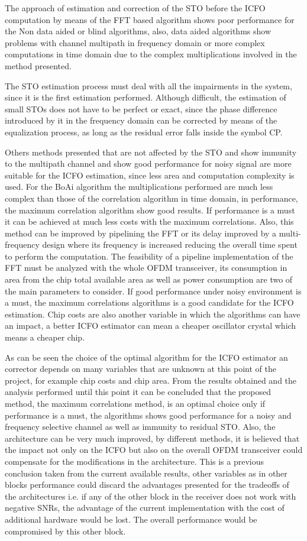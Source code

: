 The approach of estimation and correction of the STO before the ICFO computation by means of the FFT based algorithm shows poor performance for the Non data aided or blind algorithms, also, data aided algorithms show problems with channel multipath in frequency domain or more complex computations in time domain due to the complex multiplications involved in the method presented. 

The STO estimation process must deal with all the impairments in the system, since it is the first estimation performed. Although difficult, the  estimation of small STOs does not have to be perfect or exact, since the phase difference introduced by it in the frequency domain can be corrected by means of the equalization process, as long as the residual error falls inside the symbol CP.

Others methods presented that are not affected by the STO and show immunity to the multipath channel and show good performance for noisy signal are more suitable for the ICFO estimation, since less area and computation complexity is used. For the BoAi algorithm 
the multiplications performed are much less complex than those of the correlation algorithm in time domain, in performance, the maximum correlation algorithm show good results. If performance is a must it can be achieved at much less costs with the maximum correlations. Also, this method can be improved by pipelining the FFT or its delay improved by a multi-frequency design where its frequency is increased reducing the overall time spent to perform the computation. The feasibility of a pipeline implementation of the FFT must be analyzed with the whole OFDM transceiver, its consumption in area from the chip total available area as well as power consumption are two of the main parameters to consider. If good performance under noisy environment is a must, the maximum correlations algorithms is a good candidate for the ICFO estimation. Chip costs are also another variable in which the algorithms can have an impact, a better ICFO estimator can mean a cheaper oscillator crystal which means a cheaper chip.

As can be seen the choice of the optimal algorithm for the ICFO estimator an corrector depends on many variables that are unknown at this point of the project, for example chip costs and chip area. From the results obtained and the analysis performed until this point it can be concluded that the proposed method, the maximum correlations method, is an optimal choice only if performance is a must, the algorithms shows good performance for a noisy and frequency selective channel as well as immunity to residual STO. Also, the architecture can be very much improved, by different methods,  it is believed that the impact not only on the ICFO but also on the overall OFDM transceiver could compensate for the modifications in the architecture. This is a previous conclusion taken from the current available results, other variables as in other blocks performance could discard the advantages presented for the tradeoffs of the architectures i.e. if any of the other block in the receiver does not work with negative SNRs, the advantage of the current implementation with the cost of additional hardware would be lost. The overall performance would be compromised by this other block. 

